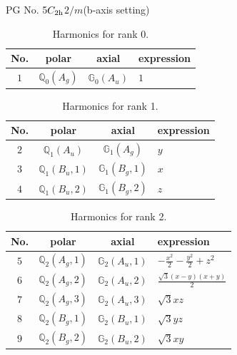 \documentclass[fleqn,8pt,landscape]{jsarticle}
\begin{document}
\setcounter{MaxMatrixCols}{32}

\renewcommand{\tablename}{Table~}
\renewcommand{\figurename}{Figure~}
\begin{center}
\LARGE
PG No. 5\quad$C_{\rm 2h}$\quad$2/m$\quad(b-axis setting)\quad[ monoclinic ]
\end{center}
\begin{table}[ht!]
\begin{center}
\caption{Harmonics for rank 0.}
\renewcommand{\arraystretch}{1.3}
\begin{tabular}{cccl} \hline \hline
No. & polar & axial & expression \\ \hline
$ 1 $ & $ \mathbb{Q}_{0}(A_{g}) $ & $ \mathbb{G}_{0}(A_{u}) $ & $ 1 $ \\
 \hline \hline
\end{tabular}
\end{center}
\end{table}
\begin{table}[ht!]
\begin{center}
\caption{Harmonics for rank 1.}
\renewcommand{\arraystretch}{1.3}
\begin{tabular}{cccl} \hline \hline
No. & polar & axial & expression \\ \hline
$ 2 $ & $ \mathbb{Q}_{1}(A_{u}) $ & $ \mathbb{G}_{1}(A_{g}) $ & $ y $ \\
$ 3 $ & $ \mathbb{Q}_{1}(B_{u},1) $ & $ \mathbb{G}_{1}(B_{g},1) $ & $ x $ \\
$ 4 $ & $ \mathbb{Q}_{1}(B_{u},2) $ & $ \mathbb{G}_{1}(B_{g},2) $ & $ z $ \\
 \hline \hline
\end{tabular}
\end{center}
\end{table}
\begin{table}[ht!]
\begin{center}
\caption{Harmonics for rank 2.}
\renewcommand{\arraystretch}{1.3}
\begin{tabular}{cccl} \hline \hline
No. & polar & axial & expression \\ \hline
$ 5 $ & $ \mathbb{Q}_{2}(A_{g},1) $ & $ \mathbb{G}_{2}(A_{u},1) $ & $ - \frac{x^{2}}{2} - \frac{y^{2}}{2} + z^{2} $ \\
$ 6 $ & $ \mathbb{Q}_{2}(A_{g},2) $ & $ \mathbb{G}_{2}(A_{u},2) $ & $ \frac{\sqrt{3} \left(x - y\right) \left(x + y\right)}{2} $ \\
$ 7 $ & $ \mathbb{Q}_{2}(A_{g},3) $ & $ \mathbb{G}_{2}(A_{u},3) $ & $ \sqrt{3} x z $ \\
$ 8 $ & $ \mathbb{Q}_{2}(B_{g},1) $ & $ \mathbb{G}_{2}(B_{u},1) $ & $ \sqrt{3} y z $ \\
$ 9 $ & $ \mathbb{Q}_{2}(B_{g},2) $ & $ \mathbb{G}_{2}(B_{u},2) $ & $ \sqrt{3} x y $ \\
 \hline \hline
\end{tabular}
\end{center}
\end{table}
\end{document}
